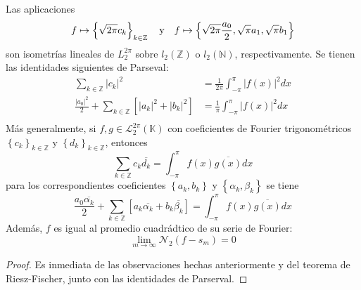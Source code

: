\documentclass[12pt]{report}
\theoremstyle{largebreak}
\newcommand\abs[1]{\ensuremath{\left|#1\right|}}
\newcommand{\N}[2]{\ensuremath{\mathcal{N}_{#1}\left(#2\right)}}
\begin{document}
    \begin{theor}
        Las aplicaciones
        \begin{equation*}
            f\mapsto \left\{\sqrt{2\pi}c_k \right\}_{k\in\mathbb{Z}}\quad\textup{y}\quad f\mapsto\left\{\sqrt{2\pi}\frac{a_0}{2},\sqrt{\pi}a_1,\sqrt{\pi}b_1 \right\}
        \end{equation*}
        son isometrías lineales de $L_2^{2\pi}$ sobre $l_2(\mathbb{Z})$ o $l_2(\mathbb{N})$, respectivamente. Se tienen las identidades siguientes de Parseval:
        \begin{equation*}
            \begin{split}
                \sum_{ k\in\mathbb{Z}}\abs{c_k}^2&=\frac{1}{2\pi}\int_{-\pi}^{\pi}\abs{f(x)}^2dx\\
                \frac{\abs{a_0}^2}{2}+\sum_{ k\in\mathbb{Z}}\left[\abs{a_k}^2+\abs{b_k}^2 \right]&=\frac{1}{\pi}\int_{-\pi}^{\pi}\abs{f(x)}^2dx\\
            \end{split}
        \end{equation*}
        Más generalmente, si $f,g\in\mathcal{L}_2^{2\pi}(\mathbb{K})$ con coeficientes de Fourier trigonométricos $\left\{c_k \right\}_{k\in\mathbb{Z}}$ y $\left\{d_k \right\}_{k\in\mathbb{Z}}$, entonces
        \begin{equation*}
            \sum_{ k\in\mathbb{Z}}c_k\overline{d_k}=\int_{-\pi}^{\pi}f(x)\overline{g(x)}dx
        \end{equation*}
        para los correspondientes coeficientes $\left\{a_k,b_k \right\}$ y  $\left\{\alpha_k,\beta_k \right\}$ se tiene
        \begin{equation*}
            \frac{a_0\overline{\alpha_k}}{2}+\sum_{ k\in\mathbb{Z}}\left[a_k\overline{\alpha_k}+b_k\overline{\beta_k} \right]=\int_{-\pi}^{\pi}f(x)\overline{g(x)}dx
        \end{equation*}
        Además, $f$ es igual al promedio cuadrádtico de su serie de Fourier:
        \begin{equation*}
            \lim_{ m\rightarrow\infty}\N{2}{f-s_m}=0
        \end{equation*}
    \end{theor}
    
    \begin{proof}
        Es inmediata de las observaciones hechas anteriormente y del teorema de Riesz-Fischer, junto con las identidades de Parserval.
    \end{proof}
\end{document}
